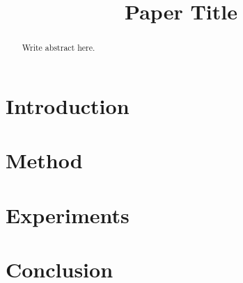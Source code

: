 \documentclass[conference]{IEEEtran}
\title{Paper Title}
\author{\IEEEauthorblockN{Author Name}}
\begin{document}
\maketitle

\begin{abstract}
Write abstract here.
\end{abstract}

\section{Introduction}

\section{Method}

\section{Experiments}

\section{Conclusion}



\end{document}
